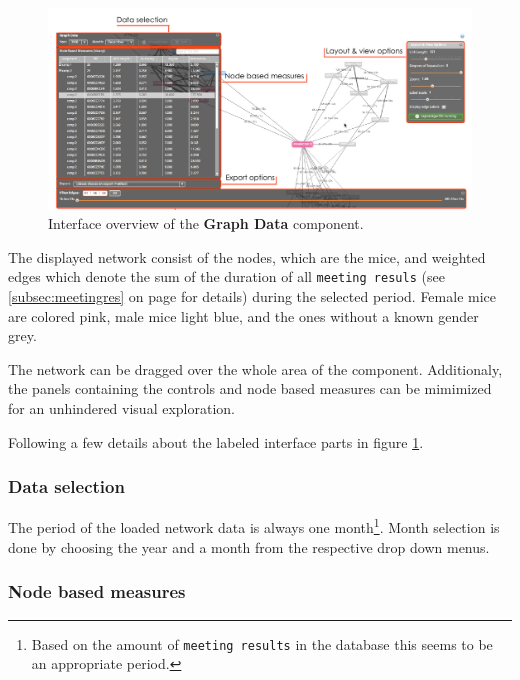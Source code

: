 \begin{figure}[!htpb]
\begin{center}
  \includegraphics[width=\textwidth]{assets/pdf/graph_data_interface_overview.pdf}
  \caption[Graph Data interface overview]{Interface overview of the \textbf{Graph Data} component.}
  \label{fig:graph_data_interface_overview}
\end{center}
\end{figure}

The displayed network consist of the nodes, which are the mice, and weighted edges which denote the sum of the duration of all \lstinline|meeting resuls| (see \ref{subsec:meetingres} on page \pageref{subsec:meetingres} for details) during the selected period. Female mice are colored pink, male mice light blue, and the ones without a known gender grey. 

The network can be dragged over the whole area of the component. Additionaly, the panels containing the controls and node based measures can be mimimized for an unhindered visual exploration.

Following a few details about the labeled interface parts in figure \ref{fig:graph_data_interface_overview}.

\subsubsection*{Data selection} 
The period of the loaded network data is always one month\footnote{Based on the amount of \lstinline|meeting results| in the database this seems to be an appropriate period.}. Month selection is done by choosing the year and a month from the respective drop down menus.  

\subsubsection*{Node based measures}

